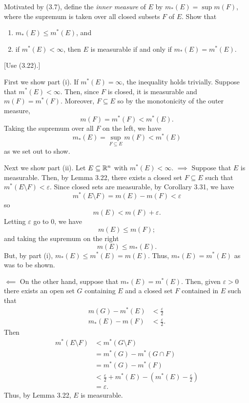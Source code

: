\begin{problem}
  Motivated by (3.7), define the \emph{inner measure} of \(E\) by
  \(m_*(E)=\sup m(F)\), where the supremum is taken over all closed subsets
  \(F\) of \(E\). Show that
  \begin{enumerate}[label=(\roman*)]
  \item \(m_*(E)\leq m^*(E)\), and
  \item if \(m^*(E)<\infty\), then \(E\) is measurable if and only if
    \(m_*(E)=m^*(E)\).
  \end{enumerate} [Use (3.22).]
\end{problem}
\begin{solution}
  First we show part (i). If \(m^*(E)=\infty\), the inequality holds
  trivially. Suppose that \(m^*(E)<\infty\). Then, since \(F\) is closed,
  it is measurable and \(m(F)=m^*(F)\). Moreover, \(F\subseteq E\) so by
  the monotonicity of the outer measure,
  \[
    m(F)=m^*(F)<m^*(E).
  \]
  Taking the supremum over all \(F\) on the left, we have
  \[
    m_*(E)=\sup_{F\subseteq E}m(F)<m^*(E)
  \]
  as we set out to show.

  Next we show part (ii). Let \(E\subseteq\mathbb{R}^n\) with
  \(m^*(E)<\infty\). \(\implies\) Suppose that \(E\) is measurable. Then,
  by Lemma 3.22, there exists a closed set \(F\subseteq E\) such that
  \(m^*(E\setminus F)<\varepsilon\). Since closed sets are measurable, by
  Corollary 3.31, we have
  \[
    m^*(E\setminus F)=m(E)-m(F)<\varepsilon
  \]
  so
  \[
    m(E)<m(F)+\varepsilon.
  \]
  Letting \(\varepsilon\) go to \(0\), we have
  \[
    m(E)\leq m(F);
  \]
  and taking the supremum on the right
  \[
    m(E)\leq m_*(E).
  \]
  But, by part (i), \(m_*(E)\leq m^*(E)=m(E)\). Thus, \(m_*(E)=m^*(E)\) as
  was to be shown.

  \(\impliedby\) On the other hand, suppose that \(m_*(E)=m^*(E)\). Then,
  given \(\varepsilon>0\) there exists an open set \(G\) containing \(E\)
  and a closed set \(F\) contained in \(E\) such that
  \begin{align*}
    m(G)-m^*(E)&<\frac{\varepsilon}{2}\\
    m_*(E)-m(F)&<\frac{\varepsilon}{2}.
  \end{align*}
  Then
  \begin{align*}
    m^*(E\setminus F)
    &<m^*(G\setminus F)\\
    &=m^*(G)-m^*(G\cap F)\\
    &=m^*(G)-m^*(F)\\
    &<\frac{\varepsilon}{2}+m^*(E)-\left(m^*(E)-\frac{\varepsilon}{2}\right)\\
    &=\varepsilon.
  \end{align*}
  Thus, by Lemma 3.22, \(E\) is measurable.
\end{solution}

